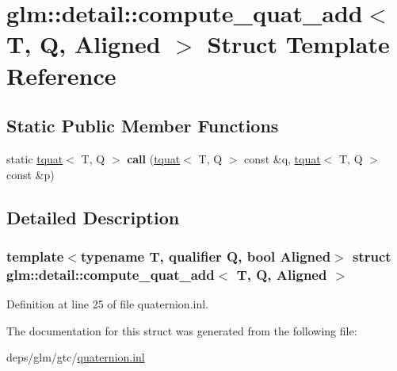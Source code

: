 \hypertarget{structglm_1_1detail_1_1compute__quat__add}{}\section{glm\+:\+:detail\+:\+:compute\+\_\+quat\+\_\+add$<$ T, Q, Aligned $>$ Struct Template Reference}
\label{structglm_1_1detail_1_1compute__quat__add}
\subsection*{Static Public Member Functions}
\begin{DoxyCompactItemize}
\item 
\mbox{\label{structglm_1_1detail_1_1compute__quat__add_a4e1737f5ba100ef22f3a9ce9b5c9ea39}} 
static \hyperlink{structglm_1_1tquat}{tquat}$<$ T, Q $>$ {\bfseries call} (\hyperlink{structglm_1_1tquat}{tquat}$<$ T, Q $>$ const \&q, \hyperlink{structglm_1_1tquat}{tquat}$<$ T, Q $>$ const \&p)
\end{DoxyCompactItemize}


\subsection{Detailed Description}
\subsubsection*{template$<$typename T, qualifier Q, bool Aligned$>$\newline
struct glm\+::detail\+::compute\+\_\+quat\+\_\+add$<$ T, Q, Aligned $>$}



Definition at line 25 of file quaternion.\+inl.



The documentation for this struct was generated from the following file\+:\begin{DoxyCompactItemize}
\item 
deps/glm/gtc/\hyperlink{gtc_2quaternion_8inl}{quaternion.\+inl}\end{DoxyCompactItemize}
